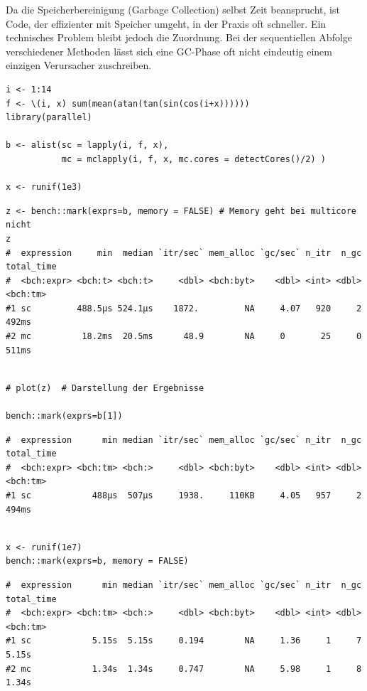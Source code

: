 \documentclass[10pt,twocolumn]{scrartcl}
\begin{document}
Da die Speicherbereinigung (Garbage Collection) selbst Zeit beansprucht, ist Code, der effizienter mit Speicher umgeht, in der Praxis oft schneller. Ein technisches Problem bleibt jedoch die Zuordnung. Bei der sequentiellen Abfolge verschiedener Methoden lässt sich eine GC-Phase oft nicht eindeutig einem einzigen Verursacher zuschreiben.

\begin{lstlisting}
i <- 1:14
f <- \(i, x) sum(mean(atan(tan(sin(cos(i+x))))))
library(parallel)

b <- alist(sc = lapply(i, f, x),
           mc = mclapply(i, f, x, mc.cores = detectCores()/2) )

x <- runif(1e3)
\end{lstlisting}
\begin{lstlisting}[aboveskip=-2pt,basicstyle=\fontsize{7.9pt}{8.5pt}\selectfont\ttfamily]
z <- bench::mark(exprs=b, memory = FALSE) # Memory geht bei multicore nicht
z
#  expression     min  median `itr/sec` mem_alloc `gc/sec` n_itr  n_gc total_time
#  <bch:expr> <bch:t> <bch:t>     <dbl> <bch:byt>    <dbl> <int> <dbl>   <bch:tm>
#1 sc         488.5µs 524.1µs    1872.         NA     4.07   920     2      492ms
#2 mc          18.2ms  20.5ms      48.9        NA     0       25     0      511ms
\end{lstlisting}
\begin{lstlisting}[aboveskip=-2pt]

# plot(z)  # Darstellung der Ergebnisse

bench::mark(exprs=b[1])
\end{lstlisting}
\begin{lstlisting}[aboveskip=-2pt,basicstyle=\fontsize{7.9pt}{8.5pt}\selectfont\ttfamily]
#  expression      min median `itr/sec` mem_alloc `gc/sec` n_itr  n_gc total_time
#  <bch:expr> <bch:tm> <bch:>     <dbl> <bch:byt>    <dbl> <int> <dbl>   <bch:tm>
#1 sc            488µs  507µs     1938.     110KB     4.05   957     2      494ms
\end{lstlisting}
\begin{lstlisting}[aboveskip=-2pt]

x <- runif(1e7)
bench::mark(exprs=b, memory = FALSE)
\end{lstlisting}
\begin{lstlisting}[aboveskip=-2pt,basicstyle=\fontsize{7.9pt}{8.5pt}\selectfont\ttfamily]
#  expression      min median `itr/sec` mem_alloc `gc/sec` n_itr  n_gc total_time
#  <bch:expr> <bch:tm> <bch:>     <dbl> <bch:byt>    <dbl> <int> <dbl>   <bch:tm>
#1 sc            5.15s  5.15s     0.194        NA     1.36     1     7      5.15s
#2 mc            1.34s  1.34s     0.747        NA     5.98     1     8      1.34s
\end{lstlisting}
\end{document}
